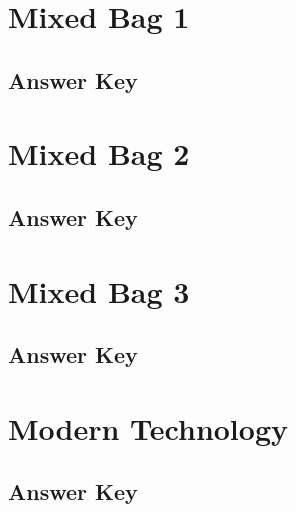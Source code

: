 \documentclass[12pt,a4paper]{book}
\newcounter{totalcounter}
\begin{document}


\setcounter{totalcounter}{1}

\section{Mixed Bag 1}



\subsection*{Answer Key}



\setcounter{totalcounter}{1}

\section{Mixed Bag 2}



\subsection*{Answer Key}



\setcounter{totalcounter}{1}

\section{Mixed Bag 3}



\subsection*{Answer Key}



\setcounter{totalcounter}{1}

\section{Modern Technology}



\subsection*{Answer Key}
\end{document}
